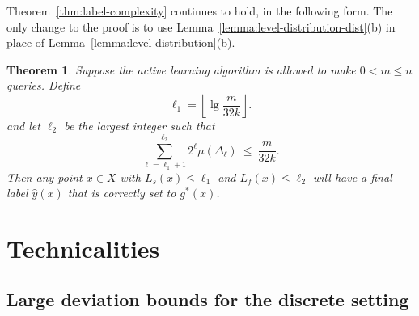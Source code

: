 \documentclass{article}
\def\yh{{\widehat{y}}}
\newtheorem{thm}{Theorem}
\begin{document}
Theorem~\ref{thm:label-complexity} continues to hold, in the following form. The only change to the proof is to use Lemma~\ref{lemma:level-distribution-dist}(b) in place of Lemma~\ref{lemma:level-distribution}(b).
\begin{thm}
Suppose the active learning algorithm is allowed to make $0 < m \leq n$ queries. Define
$$ \ell_1 = \left\lfloor \lg \frac{m}{32k} \right\rfloor .$$
and let $\ell_2$ be the largest integer such that
$$ \sum_{\ell = \ell_1 + 1}^{\ell_2} 2^\ell \mu(\Delta_{\ell}) \ \leq \ \frac{m}{32k} .$$
Then any point $x \in X$ with $L_s(x) \leq \ell_1$ and $L_f(x) \leq \ell_2$ will have a final label $\yh(x)$ that is correctly set to $g^*(x)$.
\label{thm:label-complexity-dist}
\end{thm}



\pagebreak

\appendix

\section{Technicalities}

\subsection{Large deviation bounds for the discrete setting}
\end{document}
